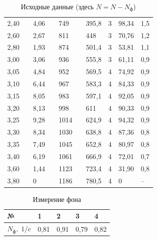 \documentclass[a4paper]{article}
\begin{document}
\begin{table}[h]
\begin{tabular}{|l|l|l|l|l|l|l|l|l|l|}
		2,40 &  & 4,06 &  & 749  &  & 395,8 & 3   & 98,34  & 1,5  \\ \cline{1-1} \cline{3-3} \cline{5-5} \cline{7-10} 
		2,60 &  & 2,67 &  & 811  &  & 448   & 3   & 70,76  & 1,2  \\ \cline{1-1} \cline{3-3} \cline{5-5} \cline{7-10} 
		2,80 &  & 1,93 &  & 874  &  & 501,4 & 3   & 53,81  & 1,1  \\ \cline{1-1} \cline{3-3} \cline{5-5} \cline{7-10} 
		3,00 &  & 3,06 &  & 936  &  & 555,8 & 3   & 61,11  & 0,9  \\ \cline{1-1} \cline{3-3} \cline{5-5} \cline{7-10} 
		3,05 &  & 4,84 &  & 952  &  & 569,5 & 4   & 74,92  & 0,9  \\ \cline{1-1} \cline{3-3} \cline{5-5} \cline{7-10} 
		3,10 &  & 6,44 &  & 967  &  & 583,3 & 4   & 84,33  & 0,9  \\ \cline{1-1} \cline{3-3} \cline{5-5} \cline{7-10} 
		3,15 &  & 8,05 &  & 983  &  & 597,1 & 4   & 92,05  & 0,9  \\ \cline{1-1} \cline{3-3} \cline{5-5} \cline{7-10} 
		3,20 &  & 8,13 &  & 998  &  & 611   & 4   & 90,33  & 0,9  \\ \cline{1-1} \cline{3-3} \cline{5-5} \cline{7-10} 
		3,25 &  & 9,28 &  & 1014 &  & 624,9 & 4   & 94,32  & 0,9  \\ \cline{1-1} \cline{3-3} \cline{5-5} \cline{7-10} 
		3,30 &  & 8,34 &  & 1030 &  & 638,8 & 4   & 87,36  & 0,8  \\ \cline{1-1} \cline{3-3} \cline{5-5} \cline{7-10} 
		3,35 &  & 7,49 &  & 1045 &  & 652,8 & 4   & 80,97  & 0,8  \\ \cline{1-1} \cline{3-3} \cline{5-5} \cline{7-10} 
		3,40 &  & 6,19 &  & 1061 &  & 666,9 & 4   & 72,01  & 0,7  \\ \cline{1-1} \cline{3-3} \cline{5-5} \cline{7-10} 
		3,60 &  & 1,44 &  & 1123 &  & 723,4 & 4   & 31,90  & 0,8  \\ \cline{1-1} \cline{3-3} \cline{5-5} \cline{7-10} 
		3,80 &  & 0    &  & 1186 &  & 780,5 & 4   & 0      & --   \\ \hline
	\end{tabular}
	\caption{Исходные данные (здесь $N = N - N_ф$)}
	\label{tab:raw}
\end{table}

	\begin{table}[h]
		\centering
		\begin{tabular}{|l|l|l|l|l|}
			\hline
			№             & 1     & 2     & 3     & 4     \\ \hline
			$N_ф, \; 1/c$ & 0,81 & 0,91 & 0,79 & 0,82 \\ \hline
		\end{tabular}
		\caption{Измерение фона}
		\label{tab:phone}
	\end{table}
\end{document}
